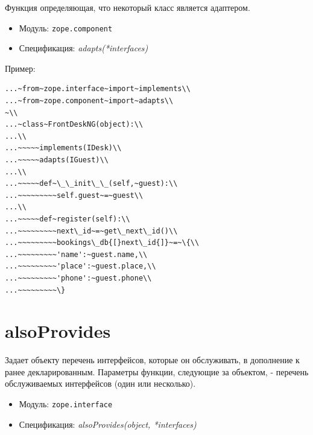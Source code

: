 \documentclass[a4paper,openany,twoside,draft]{book}
\providecommand*{\DUroletitlereference}[1]{\textsl{#1}}
\begin{document}
Функция определяющая, что некоторый класс является адаптером.

\begin{itemize}

\item Модуль: \texttt{zope.component}

\item Спецификация: \DUroletitlereference{adapts(*interfaces)}

\end{itemize}

Пример:

\begin{verbatim}
...~from~zope.interface~import~implements\\
...~from~zope.component~import~adapts\\
~\\
...~class~FrontDeskNG(object):\\
...\\
...~~~~~implements(IDesk)\\
...~~~~~adapts(IGuest)\\
...\\
...~~~~~def~\_\_init\_\_(self,~guest):\\
...~~~~~~~~~self.guest~=~guest\\
...\\
...~~~~~def~register(self):\\
...~~~~~~~~~next\_id~=~get\_next\_id()\\
...~~~~~~~~~bookings\_db{[}next\_id{]}~=~\{\\
...~~~~~~~~~'name':~guest.name,\\
...~~~~~~~~~'place':~guest.place,\\
...~~~~~~~~~'phone':~guest.phone\\
...~~~~~~~~~\}
\end{verbatim}


\section*{alsoProvides%
  \label{alsoprovides}%
}

Задает объекту перечень интерфейсов, которые он обслуживать, в дополнение
к ранее декларированным.  Параметры функции, следующие за объектом, -
перечень обслуживаемых интерфейсов (один или несколько).

\begin{itemize}

\item Модуль: \texttt{zope.interface}

\item Спецификация: \DUroletitlereference{alsoProvides(object, *interfaces)}

\end{itemize}
\end{document}

